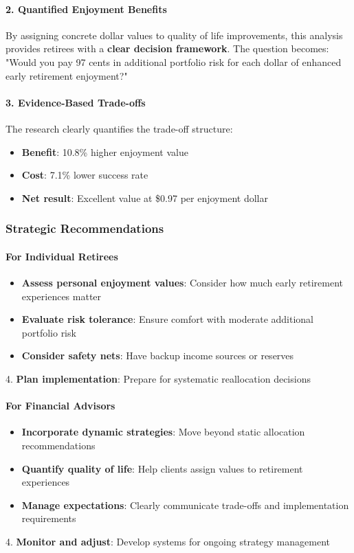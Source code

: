 \documentclass[11pt,letterpaper]{article}
\begin{document}
\paragraph{2. Quantified Enjoyment Benefits}
By assigning concrete dollar values to quality of life improvements, this analysis provides retirees with a \textbf{clear decision framework}. The question becomes: "Would you pay 97 cents in additional portfolio risk for each dollar of enhanced early retirement enjoyment?"


\paragraph{3. Evidence-Based Trade-offs}
The research clearly quantifies the trade-off structure:

\begin{itemize}
\item \textbf{Benefit}: 10.8\% higher enjoyment value
\item \textbf{Cost}: 7.1\% lower success rate
\item \textbf{Net result}: Excellent value at \$0.97 per enjoyment dollar
\end{itemize}

\subsubsection{Strategic Recommendations}

\paragraph{For Individual Retirees}
\begin{itemize}
\item \textbf{Assess personal enjoyment values}: Consider how much early retirement experiences matter
\item \textbf{Evaluate risk tolerance}: Ensure comfort with moderate additional portfolio risk
\item \textbf{Consider safety nets}: Have backup income sources or reserves
\end{itemize}
4. \textbf{Plan implementation}: Prepare for systematic reallocation decisions


\paragraph{For Financial Advisors}
\begin{itemize}
\item \textbf{Incorporate dynamic strategies}: Move beyond static allocation recommendations
\item \textbf{Quantify quality of life}: Help clients assign values to retirement experiences
\item \textbf{Manage expectations}: Clearly communicate trade-offs and implementation requirements
\end{itemize}
4. \textbf{Monitor and adjust}: Develop systems for ongoing strategy management
\end{document}
